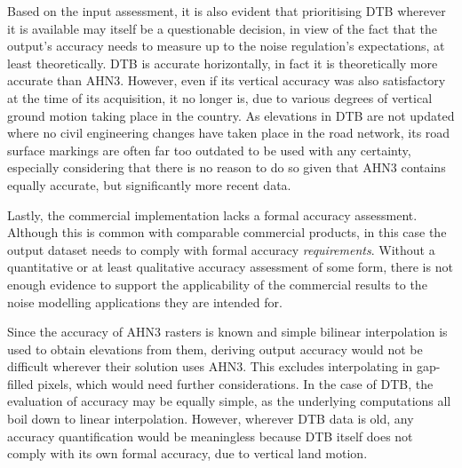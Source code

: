 Based on the input assessment, it is also evident that prioritising DTB wherever it is available may itself be a questionable decision, in view of the fact that the output's accuracy needs to measure up to the noise regulation's expectations, at least theoretically. DTB is accurate horizontally, in fact it is theoretically more accurate than AHN3. However, even if its vertical accuracy was also satisfactory at the time of its acquisition, it no longer is, due to various degrees of vertical ground motion taking place in the country. As elevations in DTB are not updated where no civil engineering changes have taken place in the road network, its road surface markings are often far too outdated to be used with any certainty, especially considering that there is no reason to do so given that AHN3 contains equally accurate, but significantly more recent data.

Lastly, the commercial implementation lacks a formal accuracy assessment. Although this is common with comparable commercial products, in this case the output dataset needs to comply with formal accuracy \textit{requirements}. Without a quantitative or at least qualitative accuracy assessment of some form, there is not enough evidence to support the applicability of the commercial results to the noise modelling applications they are intended for.

Since the accuracy of AHN3 rasters is known and simple bilinear interpolation is used to obtain elevations from them, deriving output accuracy would not be difficult wherever their solution uses AHN3. This excludes interpolating in gap-filled pixels, which would need further considerations. In the case of DTB, the evaluation of accuracy may be equally simple, as the underlying computations all boil down to linear interpolation. However, wherever DTB data is old, any accuracy quantification would be meaningless because DTB itself does not comply with its own formal accuracy, due to vertical land motion.